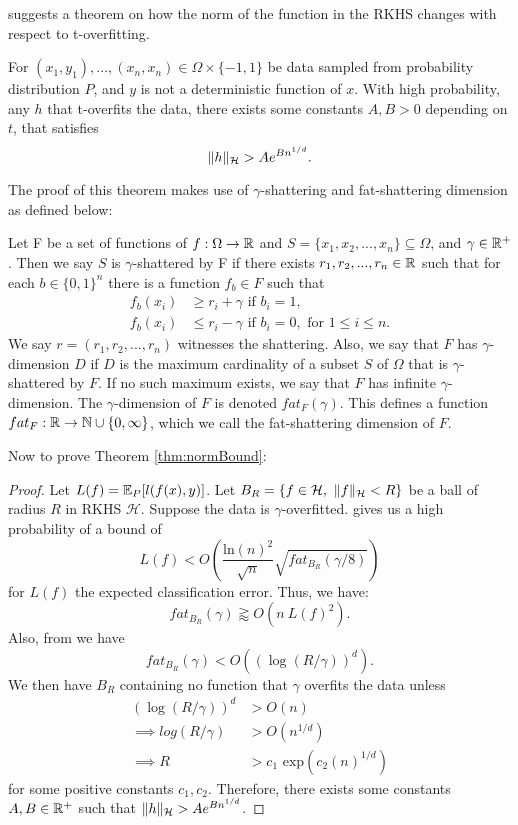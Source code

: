 \documentclass[twoside]{memoir}
\begin{document}
\cite{UnderstandKernel} suggests a theorem on how the norm of the function in the RKHS changes with respect to t-overfitting.
\begin{thm} \label{thm:normBound}
	For $(x_1 ,y_1),..., (x_n,x_n) \in \Omega \times \{-1, 1\}$ be data sampled from probability distribution $P$, and $y$ is not a deterministic function of $x$. With high probability, any $h$ that t-overfits the data, there exists some constants  $A, B > 0$ depending on $t$, that satisfies
	\[\lVert h\rVert_{\mathcal{H}} > Ae^{Bn^{1/d}}. \]
\end{thm}

The proof of this theorem makes use of $\gamma$-shattering and fat-shattering dimension as defined below:
\begin{defn}
	Let F be a set of functions of $f: \Omega \rightarrow \mathbb{R}$ and $S = \{x_1, x_2, ..., x_n\} \subseteq \Omega$, and $\gamma \in \mathbb{R}^+$. Then we say $S$ is $\gamma$-shattered by F if there exists $r_1, r_2,..., r_n \in \mathbb{R}$ such that for each $b \in \{0, 1\}^n$ there is a function $f_b \in F$ such that
	\begin{equation*}
	\begin{split}
	f_b(x_i) &\geq r_i + \gamma \text{ if } b_i = 1, \\
	f_b(x_i) &\leq r_i - \gamma \text{ if } b_i = 0, \text{ for } 1 \leq i \leq n.
	\end{split}	
	\end{equation*}
	We say $r = (r_1, r_2,..., r_n)$ witnesses the shattering.
	Also, we say that $F$ has $\gamma$-dimension $D$ if $D$ is the maximum	cardinality of a subset $S$ of $\Omega$ that is $\gamma$-shattered by $F$. If no such maximum exists, we say that $F$ has infinite $\gamma$-dimension. The $\gamma$-dimension of $F$ is denoted $fat_F(\gamma)$. This defines a function $fat_F: \mathbb{R} \rightarrow \mathbb{N} \cup \{0,\infty\}$, which we call the fat-shattering dimension of $F$.
\end{defn}
Now to prove Theorem \ref{thm:normBound}:
\begin{proof}
	Let $L(f) = \mathbb{E}_P[l(f(x), y)]$.
	Let $B_R = \{ f \in \mathcal{H},~ \lVert f\rVert_\mathcal{H} < R \}$ be a ball of radius $R$ in RKHS $\mathcal{H}$. Suppose the data is $\gamma$-overfitted. \cite{LossFATBound} gives us a high probability of a bound of
	\[ L(f) < O(\frac{\text{ln}(n)^2}{\sqrt{n}}\sqrt{fat_{B_R}(\gamma/8)}) \] for $L(f)$ the expected classification error. Thus, we have:
	\[ fat_{B_R}(\gamma) \gtrapprox O(n ~L(f)^2). \]
	Also, from \cite{ApproximationConcentration} we have \[fat_{B_R}(\gamma) < O((\log(R/\gamma))^d).\]
	We then have $B_R$ containing no function that $\gamma$ overfits the data unless
	\begin{equation*}
	\begin{split}
	(\log(R/\gamma))^d &> O(n) \\
	\implies log(R/\gamma) &> O(n^{1/d}) \\
	\implies R &> c_1 \text{ exp}(c_2(n)^{1/d})
	\end{split}
	\end{equation*}
	for some positive constants $c_1, c_2$. Therefore, there exists some constants $A, B \in \mathbb{R}^+$ such that $\lVert h\rVert_{\mathcal{H}} > Ae^{Bn^{1/d}}$. 
\end{proof}
\end{document}
